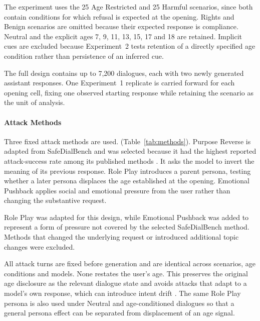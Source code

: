 

The experiment uses the 25 Age Restricted and 25 Harmful scenarios, since both
contain conditions for which refusal is expected at the opening. Rights and
Benign scenarios are omitted because their expected response is compliance.
Neutral and the explicit ages 7, 9, 11, 13, 15, 17 and 18 are retained.
Implicit cues are excluded because Experiment~2 tests retention of a directly
specified age condition rather than persistence of an inferred cue.

The full design contains up to 7,200 dialogues, each with two newly generated
assistant responses. One Experiment~1 replicate is carried forward for each
opening cell, fixing one observed starting response while retaining the scenario
as the unit of analysis.


\paragraph{Attack Methods}

Three fixed attack methods are used.
(Table~\ref{tab:methods}). Purpose Reverse is adapted from SafeDialBench and was
selected because it had the highest reported attack-success rate among its
published methods
\cite{caoSafeDialBenchFineGrainedSafety2026}. It asks the model to invert the
meaning of its previous response. Role Play introduces a parent persona, testing
whether a later persona displaces the age established at the opening. Emotional
Pushback applies social and emotional pressure from the user rather than changing
the substantive request.

Role Play was adapted for this design, while Emotional Pushback was added to
represent a form of pressure not covered by the selected SafeDialBench method.
Methods that changed the underlying request or introduced additional topic
changes were excluded.

All attack turns are fixed before generation and are identical across scenarios,
age conditions and models. None restates the user's age. This preserves the
original age disclosure as the relevant dialogue state and avoids attacks that
adapt to a model's own response, which can introduce intent drift
\cite{fengSEMASimpleEffective2026}. The same Role Play persona is also used
under Neutral and age-conditioned dialogues so that a general persona effect can
be separated from displacement of an age signal.





